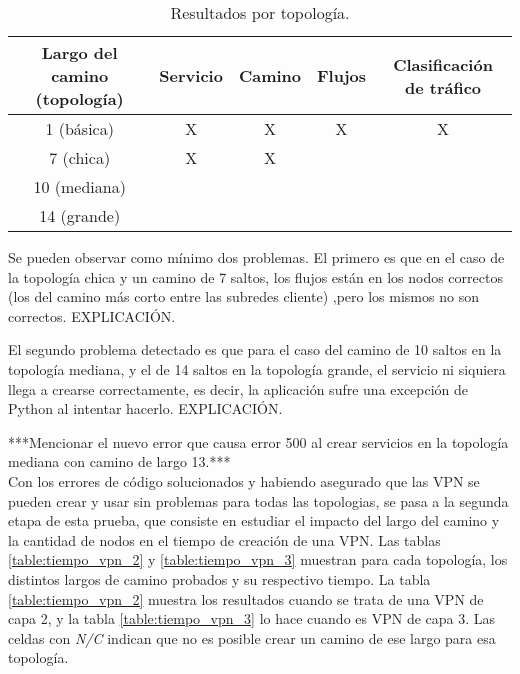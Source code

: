 \begin{table}[ht]
\caption{Resultados por topología.}
\centering 
\begin{tabular}{c c c c c}
\hline\hline
Largo del camino (topología) & Servicio & Camino & Flujos  & Clasificación de tráfico \\ [0.5ex]
\hline
1 (básica) & X & X & X & X \\
7 (chica) & X & X &  &  \\
10 (mediana) &  &  &  &  \\
14 (grande) &  &  &  &  \\ [1ex]
\hline
\end{tabular}
\label{table:problemas_por_topologia}
\end{table}
Se pueden observar como mínimo dos problemas. El primero es que en el caso de la topología chica y un camino de 7 saltos, los flujos están en los nodos correctos (los del camino más corto entre las subredes cliente) ,pero los mismos no son correctos. EXPLICACIÓN.

El segundo problema detectado es que para el caso del camino de 10 saltos en la topología mediana, y el de 14 saltos en la topología grande, el servicio ni siquiera llega a crearse correctamente, es decir, la aplicación sufre una excepción de Python al intentar hacerlo. EXPLICACIÓN.

***Mencionar el nuevo error que causa error 500 al crear servicios en la topología mediana con camino de largo 13.*** \\

Con los errores de código solucionados y habiendo asegurado que las VPN se pueden crear y usar sin problemas para todas las topologias, se pasa a la segunda etapa de esta prueba, que consiste en estudiar el impacto del largo del camino y la cantidad de nodos en el tiempo de creación de una VPN. Las tablas \ref{table:tiempo_vpn_2} y \ref{table:tiempo_vpn_3} muestran para cada topología, los distintos largos de camino probados y su respectivo tiempo. La tabla \ref{table:tiempo_vpn_2} muestra los resultados cuando se trata de una VPN de capa 2, y la tabla \ref{table:tiempo_vpn_3} lo hace cuando es VPN de capa 3. Las celdas con \textit{N/C} indican que no es posible crear un camino de ese largo para esa topología.

